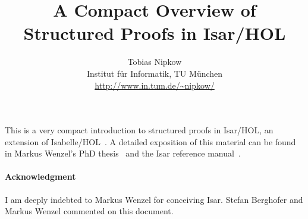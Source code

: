 \documentclass[11pt,a4paper]{article}
\begin{document}
\title{A Compact Overview of Structured Proofs in Isar/HOL}
\author{Tobias Nipkow\\Institut f{\"u}r Informatik, TU M{\"u}nchen\\
 \url{http://www.in.tum.de/~nipkow/}}
\date{}
\maketitle

\noindent
This is a very compact introduction to structured proofs in
Isar/HOL, an extension of Isabelle/HOL~\cite{LNCS2283}. A detailed
exposition of this material can be found in Markus Wenzel's PhD
thesis~\cite{Wenzel-PhD} and the Isar reference manual~\cite{Isar-Ref-Man}.



%


\paragraph{Acknowledgment}
I am deeply indebted to Markus Wenzel for conceiving Isar. Stefan Berghofer
and Markus Wenzel commented on this document.

\begingroup
 \small\raggedright\frenchspacing

\endgroup
\end{document}
